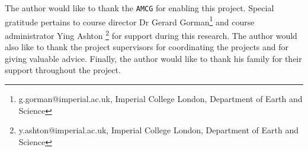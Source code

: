 \begin{acks}
The author would like to thank the \texttt{AMCG} for enabling this project. Special gratitude pertains to course director Dr Gerard Gorman\footnote{g.gorman@imperial.ac.uk, Imperial College London, Department of Earth and Science} and course administrator Ying Ashton \footnote{y.ashton@imperial.ac.uk, Imperial College London, Department of Earth and Science} for support during this research. The author would also like to thank the project supervisors for coordinating the projects and for giving valuable advice. Finally, the author would like to thank his family for their support throughout the project.
\end{acks}